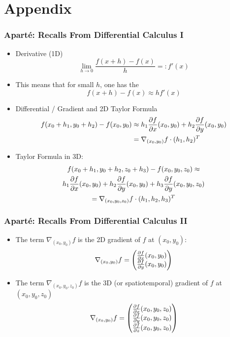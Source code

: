 \documentclass[10pt]{beamer}
\newcommand{\myemph}[1]{{\color{blue}{#1}}}
\begin{document}
\section{Appendix}



\begin{frame}
  \frametitle{Apart{\'e}: Recalls From Differential Calculus I}
  \begin{itemize}
  \item Derivative (1D)
    $$
    \lim_{h\to 0}\frac{f(x+h)-f(x)}{h} =: f'(x) 
    $$
  \item This means that for small $h$, one has the \myemph{Taylor Formula}
    $$
    f(x+h)-f(x) \approx h f'(x)
    $$
  \item Differential / Gradient and 2D Taylor Formula 
    \begin{align*}
      f(x_0+h_1,y_0+h_2) - f(x_0,y_0) &\approx h_1 \frac{\partial{f}}{\partial{x}}(x_0,y_0) + h_2\frac{\partial{f}}{\partial{y}}(x_0,y_0)
      \\ &= \nabla_{(x_0,y_0)}f\cdot (h_1,h_2)^T
    \end{align*}
  \item Taylor Formula in 3D:
    \begin{multline*}
      f(x_0+h_1,y_0+h_2,z_0+h_3) - f(x_0,y_0,z_0) \approx\\ h_1 \frac{\partial{f}}{\partial{x}}(x_0,y_0) + h_2\frac{\partial{f}}{\partial{y}}(x_0,y_0) + h_3\frac{\partial{f}}{\partial{y}}(x_0,y_0,z_0)
      \\ = \nabla_{(x_0,y_0,z_0)}f\cdot (h_1,h_2,h_3)^T
    \end{multline*}
  \end{itemize}
\end{frame}

\begin{frame}
  \frametitle{Apart{\'e}: Recalls From Differential Calculus II}
  \begin{itemize}
  \item The term  $\nabla_{(x_0,y_0)}f$ is the 2D gradient of $f$ at $(x_0,y_0)$:
    $$
    \nabla_{(x_0,y_0)}f =
    \begin{pmatrix}
       \frac{\partial{f}}{\partial{x}}(x_0,y_0)\\\frac{\partial{f}}{\partial{y}}(x_0,y_0)
    \end{pmatrix}
    $$
  \item The term $\nabla_{(x_0,y_0,z_0)}f$ is the 3D (or spatiotemporal) gradient of $f$ at $(x_0,y_0,z_0)$
    $$
    \nabla_{(x_0,y_0)}f =
    \begin{pmatrix}
      \frac{\partial{f}}{\partial{x}}(x_0,y_0,z_0)\\\frac{\partial{f}}{\partial{y}}(x_0,y_0,z_0)\\\frac{\partial{f}}{\partial{z}}(x_0,y_0,z_0)
    \end{pmatrix}
    $$
  \end{itemize}
\end{frame}
\end{document}
